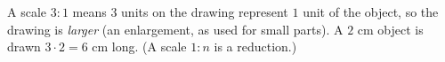A scale $3:1$ means $3$ units on the drawing represent $1$ unit of the object, so the drawing is \emph{larger} (an enlargement, as used for small parts). A $2$ cm object is drawn $3\cdot2=\boxed{6\text{ cm}}$ long. (A scale $1:n$ is a reduction.)
